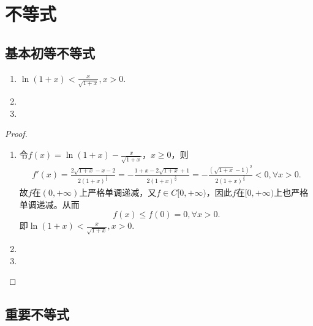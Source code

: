 \documentclass[lang=cn,newtx,10pt,scheme=chinese]{elegantbook}
\begin{document}
\chapter{不等式}

\section{基本初等不等式}

\begin{proposition}[关于ln的常用不等式]\label{proposition:关于ln的常用不等式}
\begin{enumerate}[(1)]
   \item\label{proposition:关于ln的常用不等式1} $\ln \left( 1+x \right) <\frac{x}{\sqrt{1+x}},x>0.$

   \item 

   \item 
\end{enumerate}
\end{proposition}
\begin{proof}
\begin{enumerate}[(1)]
   \item 令\(f(x)=\ln(1 + x)-\frac{x}{\sqrt{1 + x}}\)，\(x\geqslant 0\)，则
   \begin{align*}
      f'\left( x \right) =\frac{2\sqrt{1+x}-x-2}{2\left( 1+x \right) ^{\frac{3}{2}}}=-\frac{1+x-2\sqrt{1+x}+1}{2\left( 1+x \right) ^{\frac{3}{2}}}=-\frac{\left( \sqrt{1+x}-1 \right) ^2}{2\left( 1+x \right) ^{\frac{3}{2}}}<0,\forall x>0.
   \end{align*}
   故\(f\)在\((0,+\infty)\)上严格单调递减，又\(f\in C[0,+\infty)\)，因此\(f\)在\([0,+\infty)\)上也严格单调递减。从而
   \[
   f(x)\leqslant f(0)=0,\forall x>0.
   \]
   即\(\ln(1 + x)<\frac{x}{\sqrt{1 + x}},x>0\).

   \item 

   \item 
\end{enumerate}
\end{proof}




\section{重要不等式}
\end{document}

